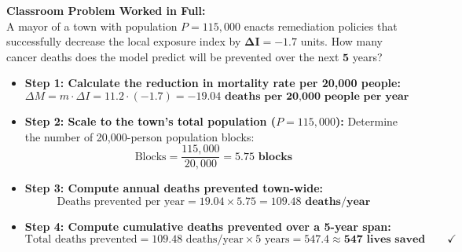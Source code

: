 \documentclass[10.5pt]{article}
\begin{document}
\vspace{0.03in}

\begin{tcolorbox}[colback=chalkblue!6, colframe=chalkblue, boxrule=1pt, arc=3pt, left=8pt, right=8pt, top=4pt, bottom=4pt]
\textbf{Classroom Problem Worked in Full:}\\[2pt]
A mayor of a town with population $P = 115,000$ enacts remediation policies that successfully decrease the local exposure index by $\mathbf{\Delta I = -1.7}$ units. How many cancer deaths does the model predict will be prevented over the next $\mathbf{5}$ years?
\end{tcolorbox}

\begin{itemize}[leftmargin=1.2em, topsep=1pt, itemsep=4pt]
  \item \textbf{Step 1: Calculate the reduction in mortality rate per 20,000 people:}
  \[
    \Delta M = m \cdot \Delta I = 11.2 \cdot (-1.7) = \mathbf{-19.04 \text{ deaths per 20,000 people per year}}
  \]
  \item \textbf{Step 2: Scale to the town's total population ($P = 115,000$):}
  Determine the number of 20,000-person population blocks:
  \[
    \text{Blocks} = \frac{115,000}{20,000} = \mathbf{5.75 \text{ blocks}}
  \]
  \item \textbf{Step 3: Compute annual deaths prevented town-wide:}
  \[
    \text{Deaths prevented per year} = 19.04 \times 5.75 = \mathbf{109.48 \text{ deaths/year}}
  \]
  \item \textbf{Step 4: Compute cumulative deaths prevented over a 5-year span:}
  \[
    \text{Total deaths prevented} = 109.48 \text{ deaths/year} \times 5 \text{ years} = \mathbf{547.4 \approx 547 \text{ lives saved}} \qquad \checkmark
  \]
\end{itemize}
\end{document}
